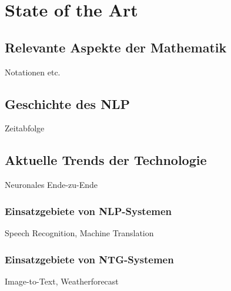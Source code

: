 \chapter{State of the Art}\label{ch:data}

\section{Relevante Aspekte der Mathematik}

Notationen etc.

\section{Geschichte des NLP}

Zeitabfolge

\section{Aktuelle Trends der Technologie}

Neuronales Ende-zu-Ende

\subsection{Einsatzgebiete von NLP-Systemen}
Speech Recognition, Machine Translation

\subsection{Einsatzgebiete von NTG-Systemen}
Image-to-Text, Weatherforecast